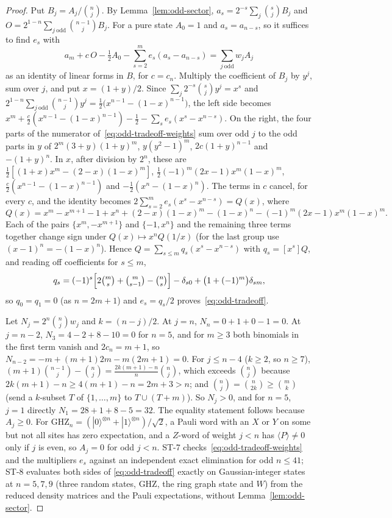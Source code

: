 \begin{proof}
Put $B_j=A_j/\binom nj$. By Lemma~\ref{lem:odd-sector}, $a_s=2^{-s}\sum_j\binom sjB_j$ and $O=2^{1-n}\sum_{j\ \mathrm{odd}}\binom{n-1}jB_j$.
For a pure state $A_0=1$ and $a_s=a_{n-s}$, so it suffices to find $e_s$ with
\[
 a_m+c\,O-\tfrac12A_0-\sum_{s=2}^me_s(a_s-a_{n-s})=\sum_{j\ \mathrm{odd}}w_jA_j
\]
as an identity of linear forms in $B$, for $c=c_n$. Multiply the coefficient of $B_j$ by $y^j$, sum over $j$, and put $x=(1+y)/2$. Since
$\sum_j2^{-s}\binom sjy^j=x^s$ and $2^{1-n}\sum_{j\ \mathrm{odd}}\binom{n-1}jy^j=\tfrac12\bigl(x^{n-1}-(1-x)^{n-1}\bigr)$, the left side becomes
$x^m+\tfrac c2(x^{n-1}-(1-x)^{n-1})-\tfrac12-\sum_se_s(x^s-x^{n-s})$. On the right, the four parts of the numerator
of~\eqref{eq:odd-tradeoff-weights} sum over odd $j$ to the odd parts in $y$ of $2^m(3+y)(1+y)^m$, $y(y^2-1)^m$, $2c(1+y)^{n-1}$ and
$-(1+y)^n$. In $x$, after division by $2^n$, these are $\tfrac12[(1+x)x^m-(2-x)(1-x)^m]$, $\tfrac12(-1)^m(2x-1)x^m(1-x)^m$,
$\tfrac c2(x^{n-1}-(1-x)^{n-1})$ and $-\tfrac12(x^n-(1-x)^n)$. The terms in $c$ cancel, for every $c$, and the identity becomes
$2\sum_{s=2}^me_s(x^s-x^{n-s})=Q(x)$, where
\[
 Q(x)=x^m-x^{m+1}-1+x^n+(2-x)(1-x)^m-(1-x)^n-(-1)^m(2x-1)x^m(1-x)^m .
\]
Each of the pairs $\{x^m,-x^{m+1}\}$ and $\{-1,x^n\}$ and the remaining three terms together change sign under
$Q(x)\mapsto x^nQ(1/x)$ (for the last group use $(x-1)^n=-(1-x)^n$). Hence $Q=\sum_{s\le m}q_s(x^s-x^{n-s})$ with $q_s=[x^s]Q$, and
reading off coefficients for $s\le m$,
\[
 q_s=(-1)^s\Bigl[2\tbinom ms+\tbinom m{s-1}-\tbinom ns\Bigr]-\delta_{s0}+\bigl(1+(-1)^m\bigr)\delta_{sm},
\]
so $q_0=q_1=0$ (as $n=2m+1$) and $e_s=q_s/2$ proves~\eqref{eq:odd-tradeoff}.

Let $N_j=2^n\binom njw_j$ and $k=(n-j)/2$. At $j=n$, $N_n=0+1+0-1=0$. At $j=n-2$, $N_3=4-2+8-10=0$ for $n=5$, and for
$m\ge3$ both binomials in the first term vanish and $2c_n=m+1$, so $N_{n-2}=-m+(m+1)2m-m(2m+1)=0$.
For $j\le n-4$ ($k\ge2$, so $n\ge7$), $(m+1)\binom{n-1}j-\binom nj=\tfrac{2k(m+1)-n}n\binom nj$, which exceeds $\binom nj$ because
$2k(m+1)-n\ge4(m+1)-n=2m+3>n$; and
$\binom nj=\binom n{2k}\ge\binom mk$ (send a $k$-subset $T$ of $\{1,\dots,m\}$ to $T\cup(T+m)$). So $N_j>0$, and for $n=5$, $j=1$ directly
$N_1=28+1+8-5=32$. The equality statement follows because $A_j\ge0$. For GHZ$_n=(|0\rangle^{\otimes n}+|1\rangle^{\otimes n})/\sqrt2$, a Pauli word with an $X$ or
$Y$ on some but not all sites has zero expectation, and a $Z$-word of weight $j<n$ has $\langle P\rangle\ne0$ only if $j$ is even, so
$A_j=0$ for odd $j<n$. ST-7 checks~\eqref{eq:odd-tradeoff-weights} and the multipliers $e_s$ against an independent exact
elimination for odd $n\le41$; ST-8 evaluates both sides of \eqref{eq:odd-tradeoff} exactly on Gaussian-integer states at $n=5,7,9$
(three random states, GHZ, the ring graph state and $W$) from the reduced density matrices and the Pauli expectations, without
Lemma~\ref{lem:odd-sector}.
\end{proof}

